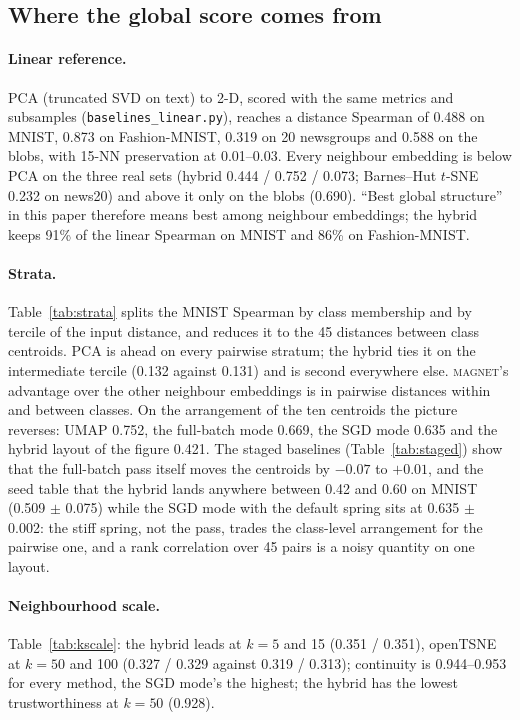 \documentclass[11pt]{article}
\newcommand{\magnet}{\textsc{magnet}}
\begin{document}
\subsection{Where the global score comes from}\label{sec:global}
\paragraph{Linear reference.} PCA (truncated SVD on text) to 2-D, scored with the same metrics and
subsamples (\texttt{baselines\_linear.py}), reaches a distance Spearman of 0.488 on MNIST, 0.873 on
Fashion-MNIST, 0.319 on 20 newsgroups and 0.588 on the blobs, with 15-NN preservation at 0.01--0.03.
Every neighbour embedding is below PCA on the three real sets (hybrid 0.444 / 0.752 / 0.073; Barnes--Hut
$t$-SNE 0.232 on news20) and above it only on the blobs (0.690). ``Best global structure'' in this paper
therefore means best among neighbour embeddings; the hybrid keeps 91\% of the linear Spearman on MNIST
and 86\% on Fashion-MNIST.

\paragraph{Strata.} Table~\ref{tab:strata} splits the MNIST Spearman by class membership and by tercile
of the input distance, and reduces it to the 45 distances between class centroids. PCA is ahead on every
pairwise stratum; the hybrid ties it on the intermediate tercile (0.132 against 0.131) and is second
everywhere else. \magnet{}'s advantage over the other neighbour embeddings is in pairwise distances within
and between classes. On the arrangement of the ten centroids the picture reverses: UMAP 0.752, the
full-batch mode 0.669, the SGD mode 0.635 and the hybrid layout of the figure 0.421. The staged baselines
(Table~\ref{tab:staged}) show that the full-batch pass itself moves the centroids by $-0.07$ to $+0.01$,
and the seed table that the hybrid lands anywhere between 0.42 and 0.60 on MNIST (0.509 $\pm$ 0.075)
while the SGD mode with the default spring sits at 0.635 $\pm$ 0.002: the
stiff spring, not the pass, trades the class-level arrangement for the pairwise one, and a rank
correlation over 45 pairs is a noisy quantity on one layout.

\paragraph{Neighbourhood scale.} Table~\ref{tab:kscale}: the hybrid leads at $k = 5$ and 15 (0.351 /
0.351), openTSNE at $k = 50$ and 100 (0.327 / 0.329 against 0.319 / 0.313); continuity is 0.944--0.953 for
every method, the SGD mode's the highest; the hybrid has the lowest trustworthiness at $k = 50$ (0.928).
\end{document}
